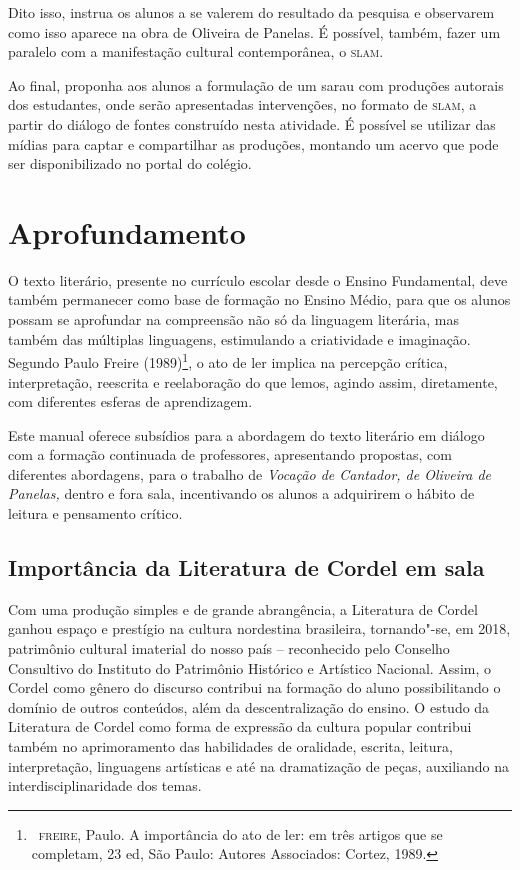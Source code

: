 \documentclass{article}
\begin{document}
Dito isso, instrua os alunos a se valerem do resultado da pesquisa e
observarem como isso aparece na obra de Oliveira de Panelas. É possível,
também, fazer um paralelo com a manifestação cultural contemporânea, o
\textsc{slam}.

Ao final, proponha aos alunos a formulação de um sarau com produções
autorais dos estudantes, onde serão apresentadas intervenções, no
formato de \textsc{slam}, a partir do diálogo de fontes construído nesta
atividade. É possível se utilizar das mídias para captar e compartilhar
as produções, montando um acervo que pode ser disponibilizado no portal
do colégio.

\section{Aprofundamento}

O texto literário, presente no currículo escolar desde o Ensino
Fundamental, deve também permanecer como base de formação no Ensino
Médio, para que os alunos possam se aprofundar na compreensão não só da
linguagem literária, mas também das múltiplas linguagens, estimulando a
criatividade e imaginação. Segundo Paulo Freire (1989)\footnote{~\textsc{freire},
  Paulo. A importância do ato de ler: em três artigos que se completam,
  23 ed, São Paulo: Autores Associados: Cortez, 1989.}, o ato de ler
implica na percepção crítica, interpretação, reescrita e reelaboração do
que lemos, agindo assim, diretamente, com diferentes esferas de
aprendizagem.

Este manual oferece subsídios para a abordagem do texto literário em
diálogo com a formação continuada de professores, apresentando
propostas, com diferentes abordagens, para o trabalho de \emph{Vocação
de Cantador, de Oliveira de Panelas,} dentro e fora sala, incentivando
os alunos a adquirirem o hábito de leitura e pensamento crítico.

\subsection{Importância da Literatura de Cordel em sala}

Com uma produção simples e de grande abrangência, a Literatura de Cordel
ganhou espaço e prestígio na cultura nordestina brasileira, tornando"-se,
em 2018, patrimônio cultural imaterial do nosso país -- reconhecido pelo
Conselho Consultivo do Instituto do Patrimônio Histórico e Artístico
Nacional. Assim, o Cordel como gênero do discurso contribui na formação
do aluno possibilitando o domínio de outros conteúdos, além da
descentralização do ensino. O estudo da Literatura de Cordel como forma
de expressão da cultura popular contribui também no aprimoramento das
habilidades de oralidade, escrita, leitura, interpretação, linguagens
artísticas e até na dramatização de peças, auxiliando na
interdisciplinaridade dos temas.
\end{document}
